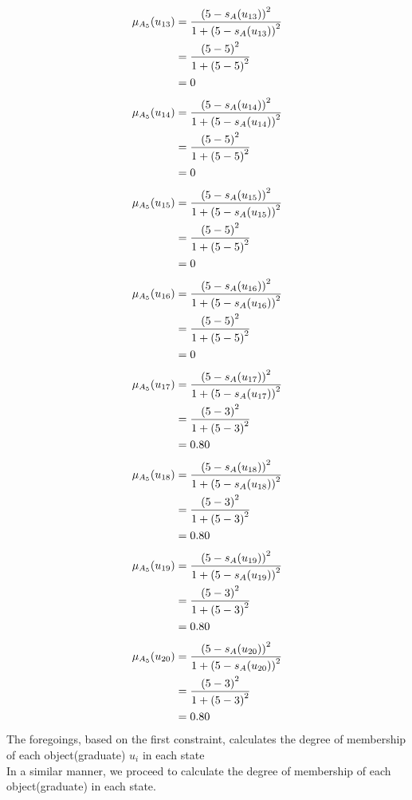 \documentclass[a4paper,openany]{book}
\begin{document}
				\begin{align}
					\mu_{A_5}(u_{13}) &= \frac{\left(5-s_A(u_{13})\right)^2}{1 + \left(5-s_A(u_{13})\right)^2}\\
					&= \frac{\left(5-5\right)^2}{1 + \left(5-5\right)^2} \notag \\
					&= 0 \notag
				\end{align}
				\begin{align}
					\mu_{A_5}(u_{14}) &= \frac{\left(5-s_A(u_{14})\right)^2}{1 + \left(5-s_A(u_{14})\right)^2}\\
					&= \frac{\left(5-5\right)^2}{1 + \left(5-5\right)^2} \notag \\
					&= 0 \notag
				\end{align}
				\begin{align}
					\mu_{A_5}(u_{15}) &= \frac{\left(5-s_A(u_{15})\right)^2}{1 + \left(5-s_A(u_{15})\right)^2}\\
					&= \frac{\left(5-5\right)^2}{1 + \left(5-5\right)^2} \notag \\
					&= 0 \notag
				\end{align}
				\begin{align}
					\mu_{A_5}(u_{16}) &= \frac{\left(5-s_A(u_{16})\right)^2}{1 + \left(5-s_A(u_{16})\right)^2}\\
					&= \frac{\left(5-5\right)^2}{1 + \left(5-5\right)^2} \notag \\
					&= 0 \notag
				\end{align}
				\begin{align}
					\mu_{A_5}(u_{17}) &= \frac{\left(5-s_A(u_{17})\right)^2}{1 + \left(5-s_A(u_{17})\right)^2}\\
					&= \frac{\left(5-3\right)^2}{1 + \left(5-3\right)^2} \notag \\
					&= 0.80 \notag
				\end{align}
				\begin{align}
					\mu_{A_5}(u_{18}) &= \frac{\left(5-s_A(u_{18})\right)^2}{1 + \left(5-s_A(u_{18})\right)^2}\\
					&= \frac{\left(5-3\right)^2}{1 + \left(5-3\right)^2} \notag \\
					&= 0.80 \notag
				\end{align}
				\begin{align}
					\mu_{A_5}(u_{19}) &= \frac{\left(5-s_A(u_{19})\right)^2}{1 + \left(5-s_A(u_{19})\right)^2}\\
					&= \frac{\left(5-3\right)^2}{1 + \left(5-3\right)^2} \notag \\
					&= 0.80 \notag
				\end{align}
				\begin{align}
					\mu_{A_5}(u_{20}) &= \frac{\left(5-s_A(u_{20})\right)^2}{1 + \left(5-s_A(u_{20})\right)^2}\\
					&= \frac{\left(5-3\right)^2}{1 + \left(5-3\right)^2} \notag \\
					&= 0.80 \notag
				\end{align}
			The foregoings, based on the first constraint, calculates the degree of membership of each object(graduate) $u_i$ in each state
			\\
			In a similar manner, we proceed to calculate the degree of membership of each object(graduate) in each state.
\end{document}
